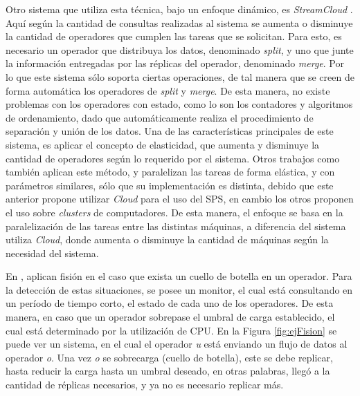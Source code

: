 Otro sistema que utiliza esta técnica, bajo un enfoque dinámico, es \textit{StreamCloud} \citep{GulisanoJPSV12}. Aquí según la cantidad de consultas realizadas al sistema se aumenta o disminuye la cantidad de operadores que cumplen las tareas que se solicitan. Para esto, es necesario un operador que distribuya los datos, denominado \textit{split}, y uno que junte la información entregadas por las réplicas del operador, denominado \textit{merge}. Por lo que este sistema sólo soporta ciertas operaciones, de tal manera que se creen de forma automática los operadores de \textit{split} y \textit{merge}. De esta manera, no existe problemas con los operadores con estado, como lo son los contadores y algoritmos de ordenamiento, dado que automáticamente realiza el procedimiento de separación y unión de los datos. Una de las características principales de este sistema, es aplicar el concepto de elasticidad, que aumenta y disminuye la cantidad de operadores según lo requerido por el sistema. Otros trabajos como \citep{GedikSHW14, SchneiderAGBW09} también aplican este método, y paralelizan las tareas de forma elástica, y con parámetros similares, sólo que su implementación es distinta, debido que este anterior propone utilizar \textit{Cloud} para el uso del SPS, en cambio los otros proponen el uso sobre \textit{clusters} de computadores. De esta manera, el enfoque se basa en la paralelización de las tareas entre las distintas máquinas, a diferencia del sistema utiliza \textit{Cloud}, donde aumenta o disminuye la cantidad de máquinas según la necesidad del sistema.

En \citep{FernandezMKP13}, aplican fisión en el caso que exista un cuello de botella en un operador. Para la detección de estas situaciones, se posee un monitor, el cual está consultando en un período de tiempo corto, el estado de cada uno de los operadores. De esta manera, en caso que un operador sobrepase el umbral de carga establecido, el cual está determinado por la utilización de CPU. En la Figura \ref{fig:ejFision} se puede ver un sistema, en el cual el operador \textit{u} está enviando un flujo de datos al operador \textit{o}. Una vez \textit{o} se sobrecarga (cuello de botella), este se debe replicar, hasta reducir la carga hasta un umbral deseado, en otras palabras, llegó a la cantidad de réplicas necesarios, y ya no es necesario replicar más.


